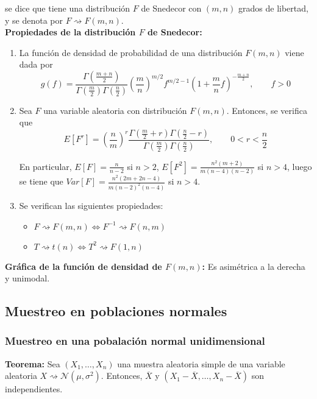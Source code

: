 \documentclass{article}
\begin{document}
se dice que tiene una distribución $F$ de Snedecor con $(m,n)$ grados de libertad, y se denota por $F\rightsquigarrow F(m,n)$.\\

\textbf{Propiedades de la distribución $F$ de Snedecor:}
\begin{enumerate}
\item La función de densidad de probabilidad de una distribución $F(m,n)$ viene dada por
\begin{equation*}
g(f)=\frac{\Gamma\left(\frac{m+n}{2}\right)}{\Gamma\left(\frac{m}{2}\right)\Gamma\left(\frac{n}{2}\right)}\left(\frac{m}{n}\right)^{m/2}f^{m/2-1}\left(1+\frac{m}{n}f\right)^{-\frac{m+n}{2}},\qquad f>0
\end{equation*}

\item Sea $F$ una variable aleatoria con distribución $F(m,n)$. Entonces, se verifica que
\begin{equation*}
E[F^r]=\left(\frac{n}{m}\right)^r\frac{\Gamma\left(\frac{m}{2}+r\right)\Gamma\left(\frac{n}{2}-r\right)}{\Gamma\left(\frac{m}{2}\right)\Gamma\left(\frac{n}{2}\right)},\qquad 0<r<\frac{n}{2}
\end{equation*}

En particular, $E[F]=\frac{n}{n-2}$ si $n>2$, $E[F^2]=\frac{n^2(m+2)}{m(n-4)(n-2)}$ si $n>4$, luego se tiene que $Var[F]=\frac{n^2(2m+2n-4)}{m(n-2)^2(n-4)}$ si $n>4$.

\item Se verifican las siguientes propiedades:
	\begin{itemize}
	\item $F\rightsquigarrow F(m,n)\Leftrightarrow F^{-1}\rightsquigarrow F(n,m)$
	\item $T\rightsquigarrow t(n)\Leftrightarrow T^2\rightsquigarrow F(1,n)$
	\end{itemize}
\end{enumerate}

\textbf{Gráfica de la función de densidad de $F(m,n)$:} Es asimétrica a la derecha y unimodal.

\subsection{Muestreo en poblaciones normales}
\subsubsection{Muestreo en una pobalación normal unidimensional}
\textbf{Teorema:} Sea $(X_1,\ldots,X_n)$ una muestra aleatoria simple de una variable aleatoria $X\rightsquigarrow \mathcal{N}(\mu,\sigma^2)$. Entonces, $\overline{X}$ y $(X_1-\overline{X},\ldots,X_n-\overline{X})$ son independientes.\\
\end{document}
